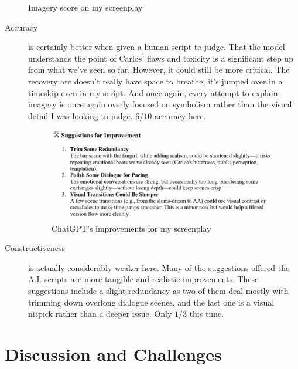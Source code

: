 \documentclass[sigconf]{acmart}
\begin{document}
\begin{description}
\begin{figure}[!hbt]
\begin{minipage}{0.2\textwidth}
        \caption{Imagery score on my screenplay}
        \label{fig:h-metrics2}
    \end{minipage}
\end{figure}
    \begin{description}
        \item[Accuracy] is certainly better when given a human script to judge. That the model understands the point of Carlos' flaws and toxicity is a significant step up from what we've seen so far. However, it could still be more critical. The recovery arc doesn't really have space to breathe, it's jumped over in a timeskip even in my script. And once again, every attempt to explain imagery is once again overly focused on symbolism rather than the visual detail I was looking to judge. $6/10$ accuracy here.
        \begin{figure}[!hbt]
            \centering
            \includegraphics[width=0.8\linewidth]{images/HImprovements.png}
            \caption{ChatGPT's improvements for my screenplay}
            \label{fig:h-improvements}
        \end{figure}
        \item[Constructiveness] is actually considerably weaker here. Many of the suggestions offered the A.I. scripts are more tangible and realistic improvements. These suggestions include a slight redundancy as two of them deal mostly with trimming down overlong dialogue scenes, and the last one is a visual nitpick rather than a deeper issue. Only $1/3$ this time.
    \end{description}
\end{description}

\section{Discussion and Challenges}
\end{document}
